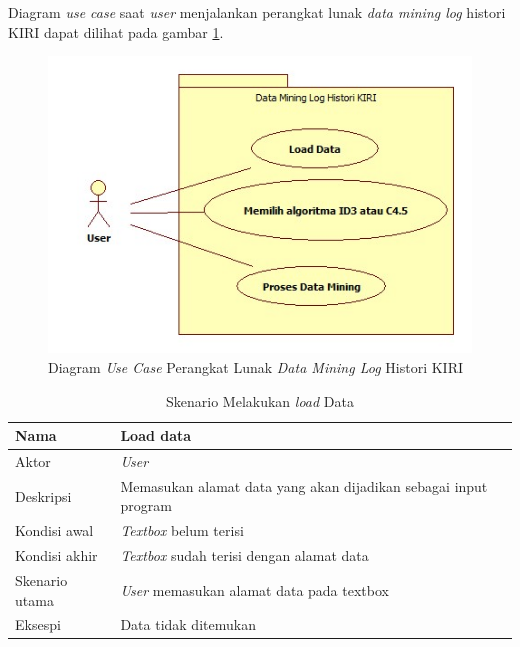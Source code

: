 Diagram \textsl{use case} saat \textsl{user} menjalankan perangkat lunak \textsl{data mining log} histori KIRI dapat dilihat pada gambar \ref{fig:diagramUseCase}.

\begin{figure}[H]
\includegraphics[scale=1]{Gambar/usecase.jpg}
\caption[Diagram \textsl{Use Case} Perangkat Lunak \textsl{Data Mining Log} Histori KIRI]{Diagram \textsl{Use Case} Perangkat Lunak \textsl{Data Mining Log} Histori KIRI} 
\label{fig:diagramUseCase}
\end{figure}

\begin{table}[H]
\caption{Skenario Melakukan \textsl{load} Data}
\begin{tabular}{|l|l|}
\hline
Nama           & Load data                                                       \\ \hline
Aktor          & \textit{User}                                                   \\ \hline
Deskripsi      & Memasukan alamat data yang akan dijadikan sebagai input program \\ \hline
Kondisi awal   & \textsl{Textbox} belum terisi                                   \\ \hline
Kondisi akhir  & \textsl{Textbox} sudah terisi dengan alamat data                \\ \hline
Skenario utama & \textit{User} memasukan alamat data pada textbox                \\ \hline
Eksespi        & Data tidak ditemukan                                            \\ \hline
\end{tabular}
\end{table}

